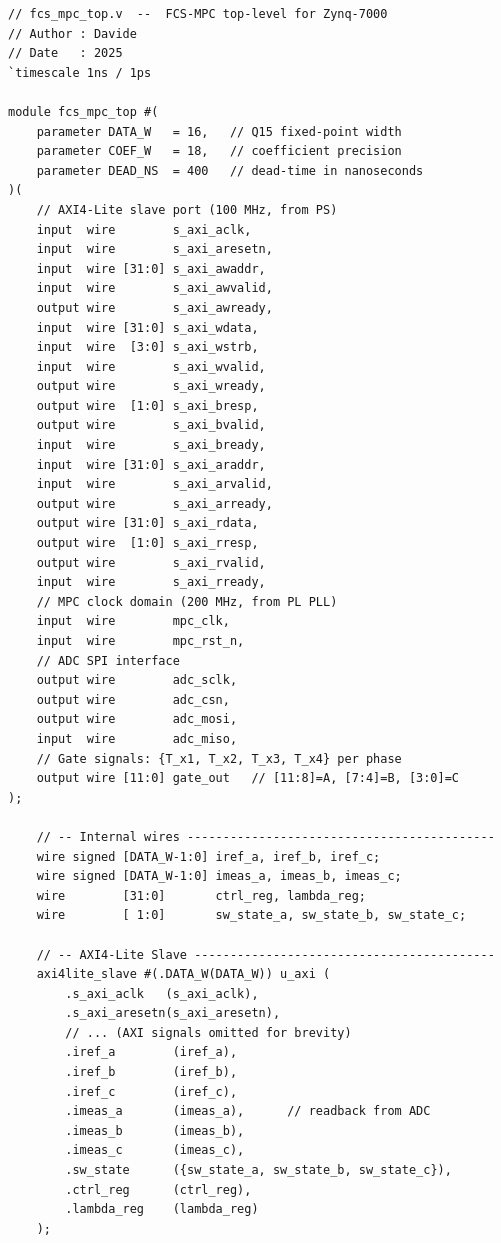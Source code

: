 \documentclass[11pt,a4paper]{article}
\begin{document}
\begin{lstlisting}[style=verilog, caption={Top-level Verilog module skeleton
  for the FCS-MPC IP core.}, label={lst:top}]
// fcs_mpc_top.v  --  FCS-MPC top-level for Zynq-7000
// Author : Davide
// Date   : 2025
`timescale 1ns / 1ps

module fcs_mpc_top #(
    parameter DATA_W   = 16,   // Q15 fixed-point width
    parameter COEF_W   = 18,   // coefficient precision
    parameter DEAD_NS  = 400   // dead-time in nanoseconds
)(
    // AXI4-Lite slave port (100 MHz, from PS)
    input  wire        s_axi_aclk,
    input  wire        s_axi_aresetn,
    input  wire [31:0] s_axi_awaddr,
    input  wire        s_axi_awvalid,
    output wire        s_axi_awready,
    input  wire [31:0] s_axi_wdata,
    input  wire  [3:0] s_axi_wstrb,
    input  wire        s_axi_wvalid,
    output wire        s_axi_wready,
    output wire  [1:0] s_axi_bresp,
    output wire        s_axi_bvalid,
    input  wire        s_axi_bready,
    input  wire [31:0] s_axi_araddr,
    input  wire        s_axi_arvalid,
    output wire        s_axi_arready,
    output wire [31:0] s_axi_rdata,
    output wire  [1:0] s_axi_rresp,
    output wire        s_axi_rvalid,
    input  wire        s_axi_rready,
    // MPC clock domain (200 MHz, from PL PLL)
    input  wire        mpc_clk,
    input  wire        mpc_rst_n,
    // ADC SPI interface
    output wire        adc_sclk,
    output wire        adc_csn,
    output wire        adc_mosi,
    input  wire        adc_miso,
    // Gate signals: {T_x1, T_x2, T_x3, T_x4} per phase
    output wire [11:0] gate_out   // [11:8]=A, [7:4]=B, [3:0]=C
);

    // -- Internal wires -------------------------------------------
    wire signed [DATA_W-1:0] iref_a, iref_b, iref_c;
    wire signed [DATA_W-1:0] imeas_a, imeas_b, imeas_c;
    wire        [31:0]       ctrl_reg, lambda_reg;
    wire        [ 1:0]       sw_state_a, sw_state_b, sw_state_c;

    // -- AXI4-Lite Slave ------------------------------------------
    axi4lite_slave #(.DATA_W(DATA_W)) u_axi (
        .s_axi_aclk   (s_axi_aclk),
        .s_axi_aresetn(s_axi_aresetn),
        // ... (AXI signals omitted for brevity)
        .iref_a        (iref_a),
        .iref_b        (iref_b),
        .iref_c        (iref_c),
        .imeas_a       (imeas_a),      // readback from ADC
        .imeas_b       (imeas_b),
        .imeas_c       (imeas_c),
        .sw_state      ({sw_state_a, sw_state_b, sw_state_c}),
        .ctrl_reg      (ctrl_reg),
        .lambda_reg    (lambda_reg)
    );


\end{lstlisting}
\end{document}
